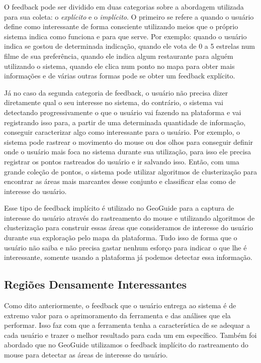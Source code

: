 O feedback pode ser dividido em duas categorias sobre a abordagem utilizada para sua coleta: o \textit{explícito} e o \textit{implícito}. O primeiro se refere a quando o usuário define como interessante de forma consciente utilizando meios que o próprio sistema indica como funciona e para que serve. Por exemplo: quando o usuário indica se gostou de determinada indicação, quando ele vota de 0 a 5 estrelas num filme de sua preferência, quando ele indica algum restaurante para alguém utilizando o sistema, quando ele clica num ponto no mapa para obter mais informações e de várias outras formas pode se obter um feedback explícito.

Já no caso da segunda categoria de feedback, o usuário não precisa dizer diretamente qual o seu interesse no sistema, do contrário, o sistema vai detectando progressivamente o que o usuário vai fazendo na plataforma e vai registrando isso para, a partir de uma determinada quantidade de informação, conseguir caracterizar algo como interessante para o usuário. Por exemplo, o sistema pode rastrear o movimento do mouse ou dos olhos para conseguir definir onde o usuário mais foca no sistema durante sua utilização, para isso ele precisa registrar os pontos rastreados do usuário e ir salvando isso. Então, com uma grande coleção de pontos, o sistema pode utilizar algoritmos de clusterização para encontrar as áreas mais marcantes desse conjunto e classificar elas como de interesse do usuário.

Esse tipo de feedback implícito é utilizado no GeoGuide para a captura de interesse do usuário através do rastreamento do mouse e utilizando algoritmos de clusterização para construir essas áreas que consideramos de interesse do usuário durante sua exploração pelo mapa da plataforma. Tudo isso de forma que o usuário não saiba e não precisa gastar nenhum esforço para indicar o que lhe é interessante, somente usando a plataforma já podemos detectar essa informação.

\subsection{Regiões Densamente Interessantes}

Como dito anteriormente, o feedback que o usuário entrega ao sistema é de extremo valor para o aprimoramento da ferramenta e das análises que ela performar. Isso faz com que a ferramenta tenha a característica de se adequar a cada usuário e trazer o melhor resultado para cada um em específico. Também foi abordado que no GeoGuide utilizamos o feedback implícito do rastreamento do mouse para detectar as áreas de interesse do usuário.

